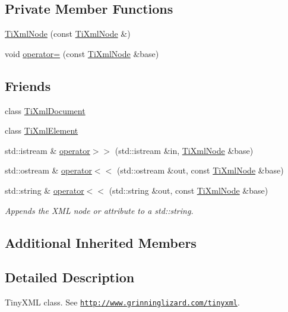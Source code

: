 \subsection*{Private Member Functions}
\begin{DoxyCompactItemize}
\item 
\hyperlink{class_ti_xml_node_a5ca3233e05032d121b13fac8273de68d}{Ti\+Xml\+Node} (const \hyperlink{class_ti_xml_node}{Ti\+Xml\+Node} \&)
\item 
void \hyperlink{class_ti_xml_node_a9eb62a8d95b8a98ec2df481cc9e5a7e2}{operator=} (const \hyperlink{class_ti_xml_node}{Ti\+Xml\+Node} \&base)
\end{DoxyCompactItemize}
\subsection*{Friends}
\begin{DoxyCompactItemize}
\item 
class \hyperlink{class_ti_xml_node_a173617f6dfe902cf484ce5552b950475}{Ti\+Xml\+Document}
\item 
class \hyperlink{class_ti_xml_node_ab6592e32cb9132be517cc12a70564c4b}{Ti\+Xml\+Element}
\item 
std\+::istream \& \hyperlink{class_ti_xml_node_ab57bd426563c926844f65a78412e18b9}{operator$>$$>$} (std\+::istream \&in, \hyperlink{class_ti_xml_node}{Ti\+Xml\+Node} \&base)
\item 
std\+::ostream \& \hyperlink{class_ti_xml_node_a86cd49cfb17a844c0010b3136ac966c7}{operator$<$$<$} (std\+::ostream \&out, const \hyperlink{class_ti_xml_node}{Ti\+Xml\+Node} \&base)
\item 
std\+::string \& \hyperlink{class_ti_xml_node_a52ef17e7080df2490cf87bde380685ab}{operator$<$$<$} (std\+::string \&out, const \hyperlink{class_ti_xml_node}{Ti\+Xml\+Node} \&base)
\begin{DoxyCompactList}\small\item\em Appends the X\+ML node or attribute to a std\+::string. \end{DoxyCompactList}\end{DoxyCompactItemize}
\subsection*{Additional Inherited Members}


\subsection{Detailed Description}
Tiny\+X\+ML class. See \href{http://www.grinninglizard.com/tinyxml}{\tt http\+://www.\+grinninglizard.\+com/tinyxml}. 

